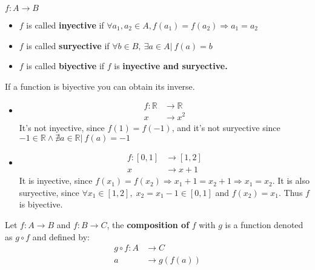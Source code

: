 \documentclass[12pt, a4paper]{book}
\begin{document}
\begin{defn}
  \boldmath
  $f:A\longrightarrow B$
  \begin{itemize}
    \item $f$ is called \textbf{inyective} if $\forall a_1,a_2 \in A, f(a_1)=f(a_2) \Rightarrow a_1=a_2$
    \item $f$ is called \textbf{suryective} if $\forall b \in B,\ \exists a\in A \vert\ f(a)=b$
    \item $f$ is called \textbf{biyective} if $f$ is \textbf{inyective and suryective.}
  \end{itemize}
  \unboldmath
\end{defn}

\begin{rem}
  If a function is biyective you can obtain its inverse.
\end{rem}

\begin{exmp}
  \begin{itemize}
    \item 
    \begin{align*}
      f:\mathbb{R} &\longrightarrow \mathbb{R} \\
      x &\longrightarrow x^2
    \end{align*}
    It's not inyective, since $f(1) = f(-1)$, and it's not suryective since $-1\in\mathbb{R} \wedge \nexists a \in \mathbb{R}\vert\ f(a)=-1$

    \item 
    \begin{align*}
      f:[0,1] &\longrightarrow [1,2] \\
      x &\longrightarrow x+1
    \end{align*}
    It is inyective, since $f(x_1) = f(x_2) \Rightarrow x_1+1=x_2+1 \Rightarrow x_1 = x_2$. It is also suryective, since $\forall x_1 \in [1,2],\; x_2=x_1-1 \in [0,1]$ and $f(x_2) = x_1$. Thus $f$ is biyective.
  \end{itemize}
\end{exmp}

\begin{defn}
  \boldmath
  Let $f:A \longrightarrow B$ and $f:B \longrightarrow C$, the \textbf{composition of} $f$ with $g$ is a function denoted as $g \circ f$ and defined by:
  \begin{align*}
    g \circ f:A &\longrightarrow C \\
    a &\longrightarrow g(f(a))
  \end{align*}
  \unboldmath
\end{defn}
\end{document}
